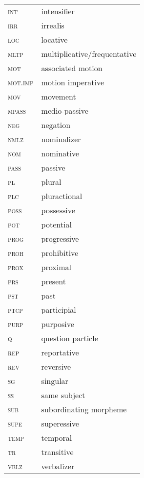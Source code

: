 %
\begin{tabular}{lp{4.5cm}}
\textsc{int}      &  intensifier \\
\textsc{irr}     &   irrealis \\
\textsc{loc}    &  locative \\
\textsc{mltp}   &  multiplicative/frequentative \\
\textsc{mot}    &  associated motion \\
\textsc{mot.imp}   &  motion imperative \\
\textsc{mov} & movement\\
\textsc{mpass}   &   medio-passive \\
\textsc{neg}    &   negation \\
\textsc{nmlz}   &  nominalizer \\
\textsc{nom}   &   nominative \\
\textsc{pass}  &  passive \\
\textsc{pl}   &   plural \\
\textsc{plc}    &  pluractional \\
\textsc{poss}      &  possessive \\
\textsc{pot}  &   potential \\
\textsc{prog}   &  progressive \\
\textsc{proh}   &  prohibitive \\
\textsc{prox}  & proximal\\
\textsc{prs}  &  present \\
\textsc{pst}   &   past \\
\textsc{ptcp}    & participial \\
\textsc{purp}    &   purposive \\
\textsc{q}      &    question particle\\
\textsc{rep}   &   reportative \\
\textsc{rev}   &   reversive \\
\textsc{sg}    &  singular \\
\textsc{ss}    &  same subject \\
\textsc{sub}  &  subordinating morpheme \\
\textsc{supe}  &   superessive \\
\textsc{temp}   &   temporal\\
\textsc{tr}   &   transitive \\
\textsc{vblz}  & verbalizer \\
\end{tabular}
